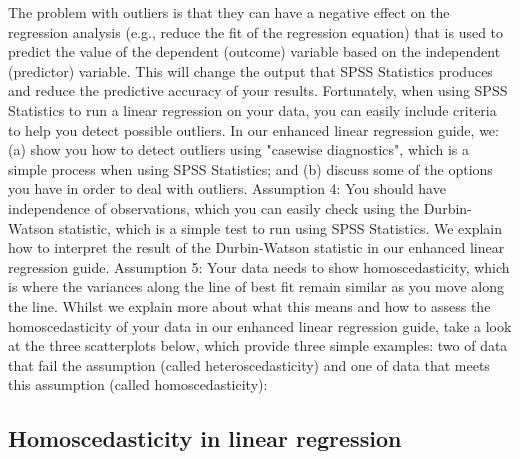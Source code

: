 \documentclass[]{article}
\begin{document}
	The problem with outliers is that they can have a negative effect on the regression analysis (e.g., reduce the fit of the regression equation) that is used to predict the value of the dependent (outcome) variable based on the independent (predictor) variable. This will change the output that SPSS Statistics produces and reduce the predictive accuracy of your results. Fortunately, when using SPSS Statistics to run a linear regression on your data, you can easily include criteria to help you detect possible outliers. In our enhanced linear regression guide, we: (a) show you how to detect outliers using "casewise diagnostics", which is a simple process when using SPSS Statistics; and (b) discuss some of the options you have in order to deal with outliers.
	Assumption 4: You should have independence of observations, which you can easily check using the Durbin-Watson statistic, which is a simple test to run using SPSS Statistics. We explain how to interpret the result of the Durbin-Watson statistic in our enhanced linear regression guide.
	Assumption 5: Your data needs to show homoscedasticity, which is where the variances along the line of best fit remain similar as you move along the line. Whilst we explain more about what this means and how to assess the homoscedasticity of your data in our enhanced linear regression guide, take a look at the three scatterplots below, which provide three simple examples: two of data that fail the assumption (called heteroscedasticity) and one of data that meets this assumption (called homoscedasticity):
	
	\subsection*{Homoscedasticity in linear regression}
	
\end{document}
